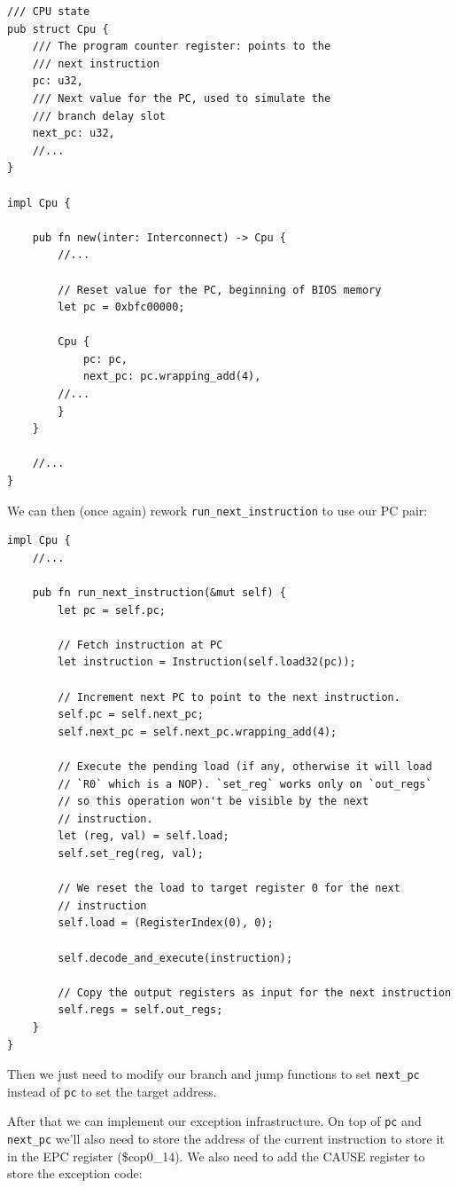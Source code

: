 \documentclass[a4paper]{article}
\newcommand{\code}[1] {\texttt{#1}}
\begin{document}
\begin{lstlisting}
/// CPU state
pub struct Cpu {
    /// The program counter register: points to the
    /// next instruction
    pc: u32,
    /// Next value for the PC, used to simulate the
    /// branch delay slot
    next_pc: u32,
    //...
}

impl Cpu {

    pub fn new(inter: Interconnect) -> Cpu {
        //...

        // Reset value for the PC, beginning of BIOS memory
        let pc = 0xbfc00000;

        Cpu {
            pc: pc,
            next_pc: pc.wrapping_add(4),
	    //...
        }
    }

    //...
}
\end{lstlisting}

We can then (once again) rework \code{run\_next\_instruction} to use
our PC pair:

\begin{lstlisting}
impl Cpu {
    //...

    pub fn run_next_instruction(&mut self) {
        let pc = self.pc;

        // Fetch instruction at PC
        let instruction = Instruction(self.load32(pc));

        // Increment next PC to point to the next instruction.
        self.pc = self.next_pc;
        self.next_pc = self.next_pc.wrapping_add(4);

        // Execute the pending load (if any, otherwise it will load
        // `R0` which is a NOP). `set_reg` works only on `out_regs`
        // so this operation won't be visible by the next
        // instruction.
        let (reg, val) = self.load;
        self.set_reg(reg, val);

        // We reset the load to target register 0 for the next
        // instruction
        self.load = (RegisterIndex(0), 0);

        self.decode_and_execute(instruction);

        // Copy the output registers as input for the next instruction
        self.regs = self.out_regs;
    }
}
\end{lstlisting}

Then we just need to modify our branch and jump functions to set
\code{next\_pc} instead of \code{pc} to set the target address.

After that we can implement our exception infrastructure. On top of
\code{pc} and \code{next\_pc} we'll also need to store the address of
the current instruction to store it in the EPC register
(\$cop0\_14). We also need to add the CAUSE register to store the
exception code:
\end{document}
